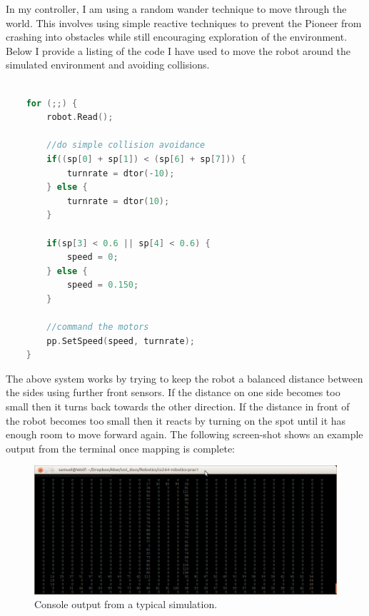\documentclass{article}
\begin{document}
In my controller, I am using a random wander technique to move through the world. This involves using simple reactive techniques to prevent the Pioneer from crashing into obstacles while still encouraging exploration of the environment. Below I provide a listing of the code I have used to move the robot around the simulated environment and avoiding collisions.

\begin{center}
	\begin{lstlisting}[language=c++, showstringspaces=false, caption={C++ code used to make control the robot to reactively wander through the environment}]

	for (;;) {
		robot.Read();

		//do simple collision avoidance
		if((sp[0] + sp[1]) < (sp[6] + sp[7])) {
			turnrate = dtor(-10);
		} else {
			turnrate = dtor(10);
		}

		if(sp[3] < 0.6 || sp[4] < 0.6) {
			speed = 0;
		} else {
			speed = 0.150;
		}

		//command the motors
		pp.SetSpeed(speed, turnrate);
	}

	\end{lstlisting}
\end{center}

The above system works by trying to keep the robot a balanced distance between the sides using further front sensors. If the distance on one side becomes too small then it turns back towards the other direction. If the distance in front of the robot becomes too small then it reacts by turning on the spot until it has enough room to move forward again. The following screen-shot shows an example output from the terminal once mapping is complete:

\begin{figure}[H]
\centering
\includegraphics[width=1\textwidth]{example_run.png}
\caption{Console output from a typical simulation.}
\label{fig:example-run}
\end{figure}
\end{document}
